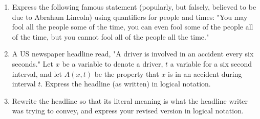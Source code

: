 \documentclass[13.5pt]{article}
\begin{document}
\begin{enumerate}
\item{Express the following famous statement (popularly, but falsely, believed to be due to Abraham Lincoln) using quantifiers for people and times: "You may fool all the people some of the time, you can even fool some of the people all of the time, but you cannot fool all of the people all the time." }

\item{ A US newspaper headline read, "A driver is involved in an accident every six seconds." Let \(x\) be a variable to denote a driver, \(t\) a variable for a six second interval, and let \(A(x,t)\) be the property that \(x\) is in an accident during interval \(t\). Express the headline (as written) in logical notation. }

\item{Rewrite the headline so that its literal meaning is what the headline writer was trying to convey, and express your revised version in logical notation.}

\end{enumerate}
\end{document}
